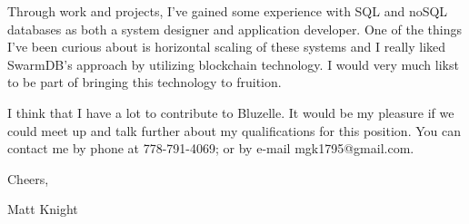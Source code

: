 \documentclass[letterpaper,12pt]{article}
\begin{document}
\vspace{1 em}
Through work and projects, I've gained some experience with SQL and noSQL
databases as both a system designer and application developer. One of the things
I've been curious about is horizontal scaling of these systems and I really
liked SwarmDB's approach by utilizing blockchain technology. I would very much
likst to be part of bringing this technology to fruition. 

\vspace{1 em}

I think that I have a lot to contribute to Bluzelle. It would be my pleasure
if we could meet up and talk further about my qualifications for this position.
You can contact me by phone at 778-791-4069; or by e-mail mgk1795@gmail.com.

\vspace{1 em}
Cheers,

Matt Knight
\end{document}
